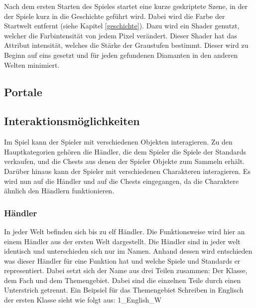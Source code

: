 Nach dem ersten Starten des Spieles startet eine kurze geskriptete Szene, in der der Spiele kurz in die Geschichte geführt wird. Dabei wird die Farbe der Startwelt entfernt  (siehe Kapitel \ref{geschichte}). Dazu wird ein Shader genutzt, welcher die Farbintensität von jedem Pixel verändert. Dieser Shader hat das Attribut intensität, welches die Stärke der Graustufen bestimmt. Dieser wird zu Beginn auf eins gesetzt und für jeden gefundenen Diamanten in den anderen Welten minimiert.
    
\subsection{Portale}


\subsection{Interaktionsmöglichkeiten}

Im Spiel kann der Spieler mit verschiedenen Objekten interagieren. Zu den Hauptkategorien gehören die Händler, die dem Spieler die Spiele der Standards verkaufen, und die Chests aus denen der Spieler Objekte zum Sammeln erhält. Darüber hinaus kann der Spieler mit verschiedenen Charakteren interagieren. Es wird nun auf die Händler und auf die Chests eingegangen, da die Charaktere ähnlich den Händlern funktionieren.

\subsubsection{Händler}

In jeder Welt befinden sich bis zu elf Händler. Die Funktionsweise wird hier an einem Händler aus der ersten Welt dargestellt. Die Händler sind in jeder welt identisch und unterschieden sich nur im Namen. Anhand dessen wird entschieden was dieser Händler für eine Funktion hat und welche Spiele und Standards er representiert. Dabei setzt sich der Name aus drei Teilen zusammen: Der Klasse, dem Fach und dem Themengebiet. Dabei sind die einzelnen Teile durch einen Unterstrich getrennt. Ein Beipsiel für das Themengebiet Schreiben in Englisch der ersten Klasse sieht wie folgt aus: 1\_English\_W


